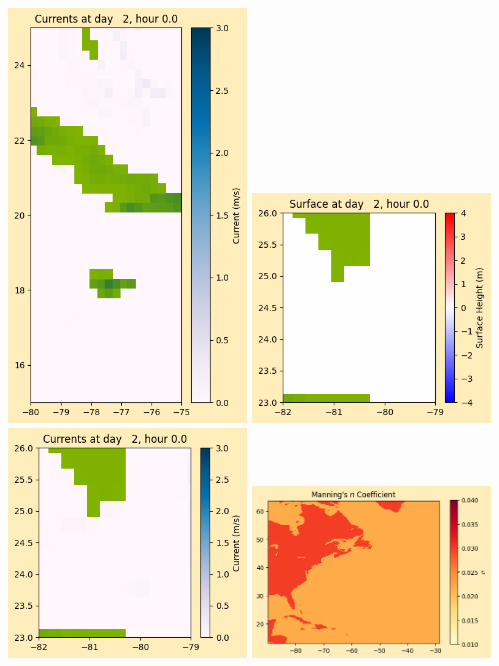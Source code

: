 \documentclass[11pt]{article}
\begin{document}
\includegraphics[width=0.475\textwidth]{frame0020fig1008.png}
\vskip 10pt 
\includegraphics[width=0.475\textwidth]{frame0020fig1009.png}
\includegraphics[width=0.475\textwidth]{frame0020fig1010.png}
\vskip 10pt 
\includegraphics[width=0.475\textwidth]{frame0020fig1011.png}
\end{document}
